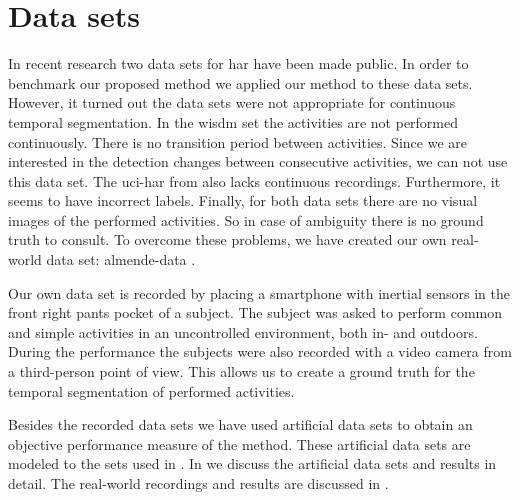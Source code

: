 \section{Data sets}\label{sec:intro_data_sets}
In recent research two data sets for \gls{har} have been made public.
In order to benchmark our proposed method we applied our method to these data sets.
However, it turned out the data sets were not appropriate for continuous temporal segmentation.
In the \gls{wisdm} set \cite{kwapisz2011activity} the activities are not performed continuously.
There is no transition period between activities.
Since we are interested in the detection changes between consecutive activities, we can not use this data set.
The \gls{uci-har} from \cite{anguita2012human} also lacks continuous recordings.
Furthermore, it seems to have incorrect labels.
Finally, for both data sets there are no visual images of the performed activities.
So in case of ambiguity there is no ground truth to consult.
To overcome these problems, we have created our own real-world data set: \acrlong{almende-data} \cite{vlasveld2014acras}.

Our own data set is recorded by placing a smartphone with inertial sensors in the front right pants pocket of a subject.
The subject was asked to perform common and simple activities in an uncontrolled environment, both in- and outdoors.
During the performance the subjects were also recorded with a video camera from a third-person point of view.
This allows us to create a ground truth for the temporal segmentation of performed activities.

Besides the recorded data sets we have used artificial data sets to obtain an objective performance measure of the method.
These artificial data sets are modeled to the sets used in \cite{camci2010change,takeuchi2006unifying}.
In  we discuss the artificial data sets and results in detail.
The real-world recordings and results are discussed in .

